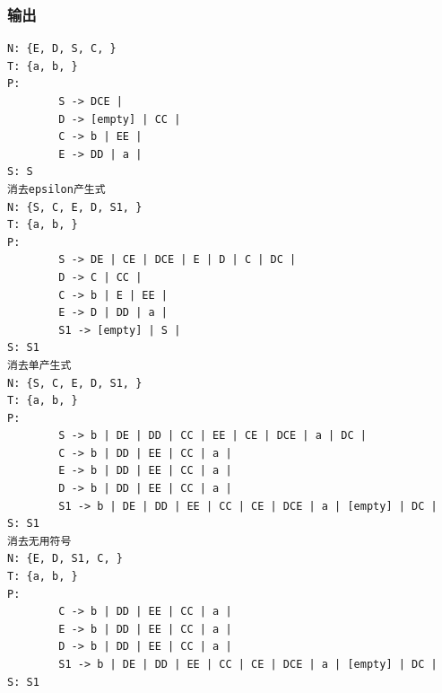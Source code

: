 \documentclass[lang=cn,11pt,a4paper,cite=authornum]{paper}
\begin{document}
\subsubsection{输出}

\begin{code}
\begin{verbatim}
N: {E, D, S, C, }
T: {a, b, }
P:
        S -> DCE | 
        D -> [empty] | CC | 
        C -> b | EE | 
        E -> DD | a | 
S: S
消去epsilon产生式
N: {S, C, E, D, S1, }
T: {a, b, }
P:
        S -> DE | CE | DCE | E | D | C | DC | 
        D -> C | CC | 
        C -> b | E | EE | 
        E -> D | DD | a | 
        S1 -> [empty] | S | 
S: S1
消去单产生式
N: {S, C, E, D, S1, }
T: {a, b, }
P:
        S -> b | DE | DD | CC | EE | CE | DCE | a | DC | 
        C -> b | DD | EE | CC | a | 
        E -> b | DD | EE | CC | a | 
        D -> b | DD | EE | CC | a | 
        S1 -> b | DE | DD | EE | CC | CE | DCE | a | [empty] | DC | 
S: S1
消去无用符号
N: {E, D, S1, C, }
T: {a, b, }
P:
        C -> b | DD | EE | CC | a | 
        E -> b | DD | EE | CC | a | 
        D -> b | DD | EE | CC | a | 
        S1 -> b | DE | DD | EE | CC | CE | DCE | a | [empty] | DC | 
S: S1
\end{verbatim}
\end{code}
\end{document}
